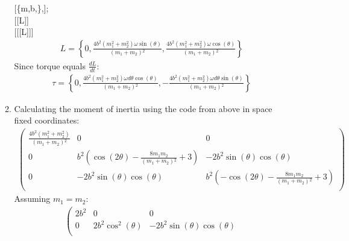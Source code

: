 \documentclass[10pt]{article}
\newcommand{\der}[2]{\frac{d #1}{d #2}}
\begin{document}
\begin{enumerate}
\begin{enumerate}
{        [\{m,b,\omega \},];\\
        [[L]]\\
        [[[L]]]
      }
      \begin{gather*}
        L=\left\{0,\frac{4 b^2 \left(m_1^2+m_2^2\right) \omega  \sin (\theta )}{\left(m_1+m_2\right){}^2},\frac{4 b^2 \left(m_1^2+m_2^2\right) \omega  \cos (\theta )}{\left(m_1+m_2\right){}^2}\right\}
      \end{gather*}
      Since torque equals $\der{L}{t}$:
      \begin{gather*}
        \tau=\left\{0,\frac{4 b^2 \left(m_1^2+m_2^2\right) \omega  d\theta  \cos (\theta )}{\left(m_1+m_2\right){}^2},-\frac{4 b^2 \left(m_1^2+m_2^2\right) \omega  d\theta  \sin (\theta )}{\left(m_1+m_2\right){}^2}\right\}
      \end{gather*}
      \item Calculating the moment of inertia using the code from above in space fixed coordinates:
      \begin{gather*}
        \left(
        \begin{array}{ccc}
          \frac{4 b^2 \left(m_1^2+m_2^2\right)}{\left(m_1+m_2\right){}^2} & 0                                                                              & 0                                                                               \\
          0                                                               & b^2 \left(\cos (2 \theta )-\frac{8 m_1 m_2}{\left(m_1+m_2\right){}^2}+3\right) & -2 b^2 \sin (\theta ) \cos (\theta ) \\
          0                                                               & -2 b^2 \sin (\theta ) \cos (\theta )                                           & b^2 \left(-\cos (2 \theta )-\frac{8 m_1 m_2}{\left(m_1+m_2\right){}^2}+3\right) \\
        \end{array}
        \right)
      \end{gather*}
      Assuming $m_1=m_2$:
      \begin{gather*}
        \left(
        \begin{array}{ccc}
          2 b^2 & 0                                    & 0                                    \\
          0     & 2 b^2 \cos ^2(\theta )               & -2 b^2 \sin (\theta ) \cos (\theta ) \\

\end{array}
\end{gather*}
\end{enumerate}
\end{enumerate}
\end{document}
